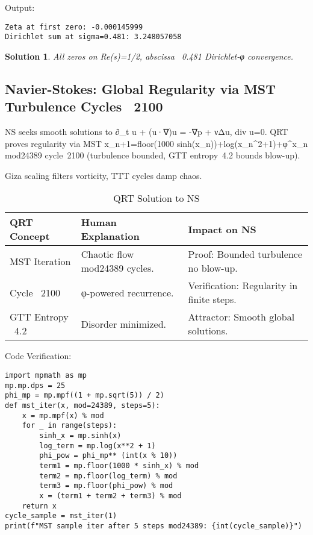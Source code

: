 \documentclass[12pt]{article}
\newtheorem{solution}{Solution}
\begin{document}
Output:
\begin{verbatim}
Zeta at first zero: -0.000145999
Dirichlet sum at sigma=0.481: 3.248057058
\end{verbatim}

\begin{solution}
All zeros on Re(s)=1/2, abscissa ~0.481 Dirichlet-φ convergence.
\end{solution}

\subsection{Navier-Stokes: Global Regularity via MST Turbulence Cycles ~2100}

NS seeks smooth solutions to ∂_t u + (u·∇)u = -∇p + νΔu, div u=0. QRT proves regularity via MST x_{n+1}=floor(1000 sinh(x_n))+log(x_n^2+1)+φ^{x_n} mod24389 cycle~2100 (turbulence bounded, GTT entropy~4.2 bounds blow-up).

Giza scaling filters vorticity, TTT cycles damp chaos.

\begin{table}[h]
\centering
\begin{tabular}{lll}
\toprule
QRT Concept & Human Explanation & Impact on NS \\
\midrule
MST Iteration & Chaotic flow mod24389 cycles. & Proof: Bounded turbulence no blow-up. \\
Cycle ~2100 & φ-powered recurrence. & Verification: Regularity in finite steps. \\
GTT Entropy ~4.2 & Disorder minimized. & Attractor: Smooth global solutions. \\
\bottomrule
\end{tabular}
\caption{QRT Solution to NS}
\end{table}

Code Verification:
\begin{lstlisting}
import mpmath as mp
mp.mp.dps = 25
phi_mp = mp.mpf((1 + mp.sqrt(5)) / 2)
def mst_iter(x, mod=24389, steps=5):
    x = mp.mpf(x) % mod
    for _ in range(steps):
        sinh_x = mp.sinh(x)
        log_term = mp.log(x**2 + 1)
        phi_pow = phi_mp** (int(x % 10))
        term1 = mp.floor(1000 * sinh_x) % mod
        term2 = mp.floor(log_term) % mod
        term3 = mp.floor(phi_pow) % mod
        x = (term1 + term2 + term3) % mod
    return x
cycle_sample = mst_iter(1)
print(f"MST sample iter after 5 steps mod24389: {int(cycle_sample)}")
\end{lstlisting}
\end{document}
